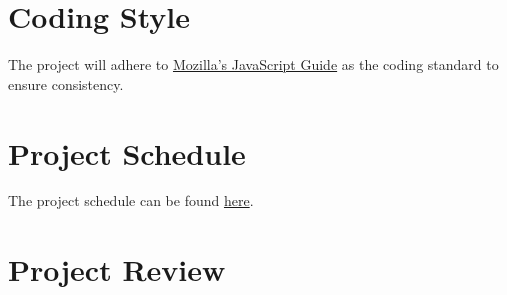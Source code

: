 \documentclass[12pt,fleqn]{article}
\begin{document}
\section{Coding Style}
\noindent The project will adhere to \href{https://developer.mozilla.org/en-US/docs/Web/JavaScript/Guide}{Mozilla's JavaScript Guide} as the coding standard to ensure consistency.

\section{Project Schedule}
\noindent The project schedule can be found \href{https://gitlab.cas.mcmaster.ca/webapp/webapp_l02_grp15/-/tree/main/ProjectSchedule}{here}.

\section{Project Review}
\end{document}
